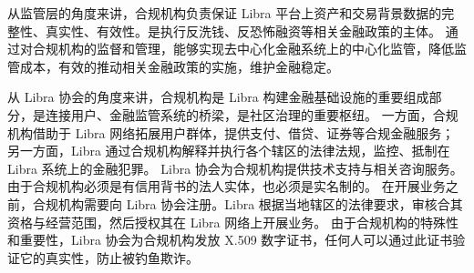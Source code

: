 从监管层的角度来讲，合规机构负责保证 Libra 平台上资产和交易背景数据的完整性、真实性、有效性。是执行反洗钱、反恐怖融资等相关金融政策的主体。
通过对合规机构的监督和管理，能够实现去中心化金融系统上的中心化监管，降低监管成本，有效的推动相关金融政策的实施，维护金融稳定。

从 Libra 协会的角度来讲，合规机构是 Libra 构建金融基础设施的重要组成部分，是连接用户、金融监管系统的桥梁，是社区治理的重要枢纽。
一方面，合规机构借助于 Libra 网络拓展用户群体，提供支付、借贷、证券等合规金融服务；
另一方面，Libra 通过合规机构解释并执行各个辖区的法律法规，监控、抵制在 Libra 系统上的金融犯罪。
Libra 协会为合规机构提供技术支持与相关咨询服务。
由于合规机构必须是有信用背书的法人实体，也必须是实名制的。
在开展业务之前，合规机构需要向 Libra 协会注册。Libra 根据当地辖区的法律要求，审核合其资格与经营范围，然后授权其在 Libra 网络上开展业务。
由于合规机构的特殊性和重要性，Libra 协会为合规机构发放 X.509 数字证书，任何人可以通过此证书验证它的真实性，防止被钓鱼欺诈。




